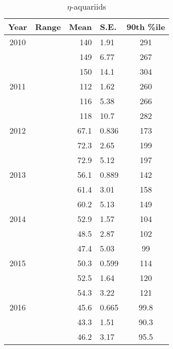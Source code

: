 \begin{table}[h!]
	\centering
	\begin{tabular}{|c|c|r@{ \,$\pm$\, }l|c|}
		\hline 
		Year & Range & Mean & S.E. & 90th \%ile\\ 
		\hline 
		2010 & & 140 & 1.91 & 291   \\ 
		\hline 
		& &	149 & 6.77 & 267   \\ 
		\hline 
		& & 150 & 14.1 & 304   \\ 
		\hline 
		2011 & & 112 & 1.62 & 260   \\ 
		\hline 
		& & 116 & 5.38 & 266   \\ 
		\hline 
		& & 118 & 10.7 & 282   \\ 
		\hline 
		2012 & & 67.1 & 0.836 & 173   \\ 
		\hline 
		& & 72.3 & 2.65 & 199   \\ 
		\hline 
		& & 72.9 & 5.12 & 197   \\ 
		\hline 
		2013 & & 56.1 & 0.889 & 142   \\ 
		\hline 
		& & 61.4 & 3.01 & 158   \\ 
		\hline 
		& & 60.2 & 5.13 & 149   \\ 
		\hline 
		2014 & & 52.9 & 1.57 & 104   \\ 
		\hline 
		& & 48.5 & 2.87 & 102   \\ 
		\hline 
		& & 47.4 & 5.03 & 99  \\ 
		\hline 
		2015 & & 50.3 & 0.599 & 114   \\ 
		\hline 
		& & 52.5 & 1.64 & 120   \\ 
		\hline 
		& & 54.3 & 3.22 & 121   \\ 
		\hline
		2016 & & 45.6 & 0.665 & 99.8	\\
		\hline 
		& & 43.3 & 1.51 & 90.3   \\ 
		\hline 
		& & 46.2 & 3.17 & 95.5   \\ 
		\hline 
	\end{tabular}
	\caption{$\eta$-aquariids} 
\end{table}
